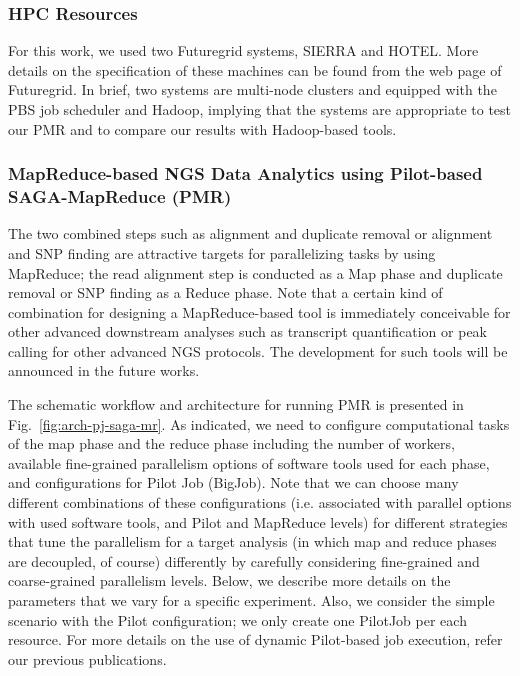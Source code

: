 \documentclass{sig-alternate}
\begin{document}
\subsubsection{HPC Resources}
For this work, we used two Futuregrid systems, SIERRA and HOTEL.  More details on the specification of these machines can be found from the web page of Futuregrid\cite{futuregrid_url}.  In brief, two systems are multi-node clusters and equipped with the PBS job scheduler and Hadoop, implying that the systems are appropriate to test our PMR and to compare our results with Hadoop-based tools.

\subsubsection{MapReduce-based NGS Data Analytics using Pilot-based SAGA-MapReduce (PMR)}
The two combined steps such as alignment and duplicate removal or alignment and SNP finding are attractive targets for  parallelizing tasks by using MapReduce; the read alignment step is conducted as a Map phase and duplicate removal or SNP finding as a Reduce phase.  Note that a certain kind of combination for designing a MapReduce-based tool is immediately conceivable for other advanced downstream analyses such as transcript quantification or peak calling for other advanced NGS protocols.  The development for such tools will be announced in the future works.

The schematic workflow and architecture for running PMR is presented in Fig.~\ref{fig:arch-pj-saga-mr}.  As indicated, we need to configure computational tasks of the map phase and the reduce phase including the number of workers, available fine-grained parallelism options of software tools used for each phase, and configurations for Pilot Job (BigJob).  Note that we can choose many different combinations of these configurations (i.e. associated with parallel options with used software tools, and Pilot and MapReduce levels) for different strategies that tune the parallelism for a target analysis (in which map and reduce phases are decoupled, of course) differently by carefully considering fine-grained and coarse-grained parallelism levels.  Below, we describe more details on the parameters that we vary for a specific experiment.  Also, we consider the simple scenario with the Pilot configuration; we only create one PilotJob per each resource. For more details on the use of dynamic Pilot-based job execution, refer our previous publications\cite{dare-ecmls11,dare-tg11,repex_ptrsa}.    
\end{document}
